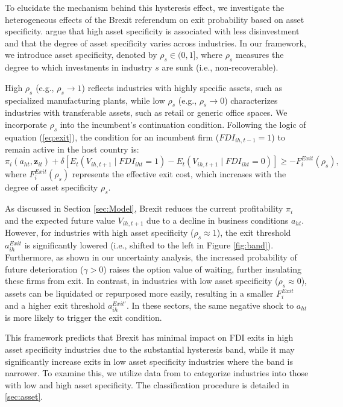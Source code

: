 \documentclass[preprint,11pt,authoryear]{elsarticle}
\begin{document}
To elucidate the mechanism behind this hysteresis effect, we investigate the heterogeneous effects of the Brexit referendum on exit probability based on asset specificity. \cite{kermani2023asset} argue that high asset specificity is associated with less disinvestment and that the degree of asset specificity varies across industries. In our framework, we introduce asset specificity, denoted by $\rho_s \in (0, 1]$, where $\rho_s$ measures the degree to which investments in industry $s$ are sunk (i.e., non-recoverable). 

High $\rho_s$ (e.g., $\rho_s \to 1$) reflects industries with highly specific assets, such as specialized manufacturing plants, while low $\rho_s$ (e.g., $\rho_s \to 0$) characterizes industries with transferable assets, such as retail or generic office spaces. We incorporate $\rho_s$ into the incumbent's continuation condition. Following the logic of equation (\ref{eq:exit}), the condition for an incumbent firm ($FDI_{ih,t-1}=1$) to remain active in the host country is:
\begin{equation}
\pi_i(a_{ht}, \mathbf{z}_{it}) + \delta \left[ E_t \left( V_{ih,t+1} \mid FDI_{iht} = 1 \right) - E_t \left( V_{ih,t+1} \mid FDI_{iht} = 0 \right) \right] \geq -F_i^{Exit}(\rho_s),
\end{equation}
where $F_i^{Exit}(\rho_s)$ represents the effective exit cost, which increases with the degree of asset specificity $\rho_s$. 

As discussed in Section \ref{sec:Model}, Brexit reduces the current profitability $\pi_i$ and the expected future value $V_{ih,t+1}$ due to a decline in business conditions $a_{ht}$. However, for industries with high asset specificity ($\rho_s \approx 1$), the exit threshold $a_{ih}^{Exit}$ is significantly lowered (i.e., shifted to the left in Figure \ref{fig:band}). Furthermore, as shown in our uncertainty analysis, the increased probability of future deterioration ($\gamma > 0$) raises the option value of waiting, further insulating these firms from exit. In contrast, in industries with low asset specificity ($\rho_s \approx 0$), assets can be liquidated or repurposed more easily, resulting in a smaller $F_i^{Exit}$ and a higher exit threshold $a_{ih}^{Exit'}$. In these sectors, the same negative shock to $a_{ht}$ is more likely to trigger the exit condition.

This framework predicts that Brexit has minimal impact on FDI exits in high asset specificity industries due to the substantial hysteresis band, while it may significantly increase exits in low asset specificity industries where the band is narrower. To examine this, we utilize data from \cite{kermani2023asset} to categorize industries into those with low and high asset specificity. The classification procedure is detailed in \ref{sec:asset}.
\end{document}
